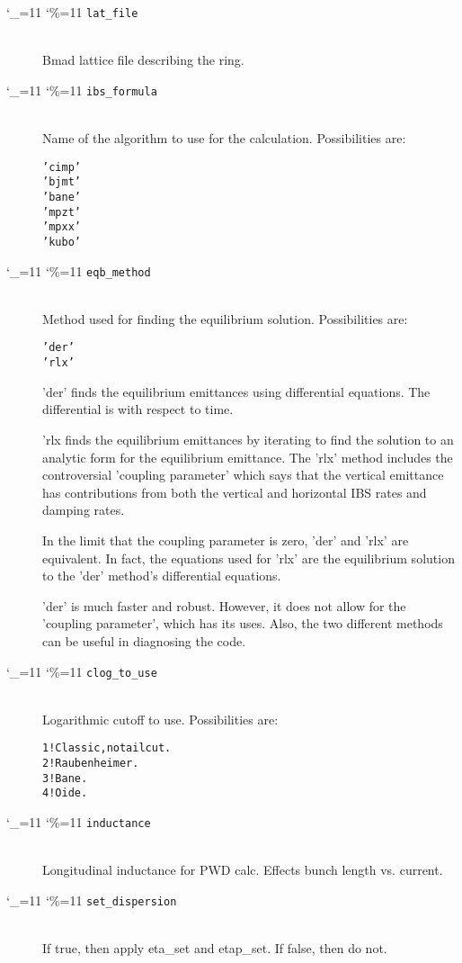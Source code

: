 \documentclass[11pt]{article}
\newcommand\ttcmd{\begingroup\catcode`\_=11 \catcode`\%=11 \dottcmd}
\newcommand\dottcmd[1]{\texttt{#1}\endgroup}
\newcommand{\vn}{\ttcmd}
\newcommand{\Newline}{\hfil \\}
\newlength{\ExBeg}
\newlength{\ExEnd}
\newenvironment{example}
  {\vspace{\ExBeg} \begin{alltt}}
  {\end{alltt} \vspace{\ExEnd}}
\begin{document}
  \begin{description}
  \item[\vn{lat_file}] \Newline
Bmad lattice file describing the ring.

  \item[\vn{ibs_formula}] \Newline
Name of the algorithm to use for the calculation. Possibilities are:
\begin{example}
  'cimp'
  'bjmt'
  'bane'
  'mpzt'
  'mpxx'
  'kubo'
\end{example}

  \item[\vn{eqb_method}] \Newline
Method used for finding the equilibrium solution. Possibilities are:
\begin{example}
  'der'
  'rlx'
\end{example}
'der' finds the equilibrium emittances using differential equations.
The differential is with respect to time.

'rlx finds the equilibrium emittances by iterating to find the
solution to an analytic form for the equilibrium emittance.  The 'rlx'
method includes the controversial 'coupling parameter' which says that
the vertical emittance has contributions from both the vertical and
horizontal IBS rates and damping rates.

In the limit that the coupling parameter is zero, 'der' and 'rlx' are
equivalent.  In fact, the equations used for 'rlx' are the equilibrium
solution to the 'der' method's differential equations.

'der' is much faster and robust.  However, it does not allow for the
'coupling parameter', which has its uses.  Also, the two different
methods can be useful in diagnosing the code.

  \item[\vn{clog_to_use}] \Newline
Logarithmic cutoff to use. Possibilities are:
\begin{example}
  1  ! Classic, no tail cut.  
  2  ! Raubenheimer.  
  3  ! Bane.
  4  ! Oide.  
\end{example} 

  \item[\vn{inductance}] \Newline
Longitudinal inductance for PWD calc.
Effects bunch length vs. current.

  \item[\vn{set_dispersion}] \Newline
If true, then apply eta_set and etap_set.
If false, then do not.


\end{description}
\end{document}
